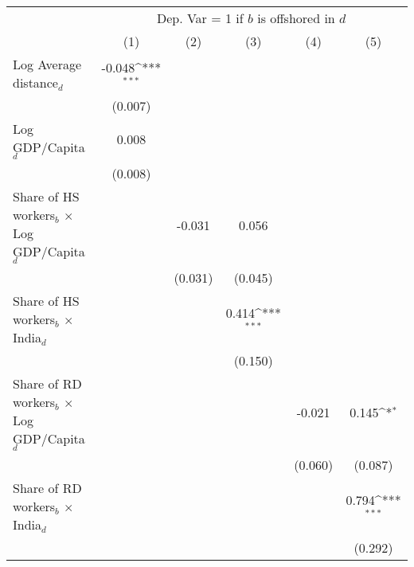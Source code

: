 \begin{table}[htbp] \footnotesize \centering
\def\sym#1{\ifmmode^{#1}\else\(^{#1}\)\fi}
\renewcommand{\arraystretch}{1}
\begin{tabular}{l*{5}{c}}
\toprule
&\multicolumn{5}{c}{Dep. Var = 1 if $ b $ is offshored in $ d $} \\
\cmidrule(lr){2-6}
                &\multicolumn{1}{c}{(1)}         &\multicolumn{1}{c}{(2)}         &\multicolumn{1}{c}{(3)}         &\multicolumn{1}{c}{(4)}         &\multicolumn{1}{c}{(5)}         \\
\midrule
Log Average distance$ _d$&   -0.048\sym{***}&                  &                  &                  &                  \\
                &  (0.007)         &                  &                  &                  &                  \\
\addlinespace
Log GDP/Capita$ _d$&    0.008         &                  &                  &                  &                  \\
                &  (0.008)         &                  &                  &                  &                  \\
\addlinespace
Share of HS workers$ _b$ $\times$ Log GDP/Capita$ _d$&                  &   -0.031         &    0.056         &                  &                  \\
                &                  &  (0.031)         &  (0.045)         &                  &                  \\
\addlinespace
Share of HS workers$ _b$ $\times$ India$ _d$&                  &                  &    0.414\sym{***}&                  &                  \\
                &                  &                  &  (0.150)         &                  &                  \\
\addlinespace
Share of RD workers$ _b$ $\times$ Log GDP/Capita$ _d$&                  &                  &                  &   -0.021         &    0.145\sym{*}  \\
                &                  &                  &                  &  (0.060)         &  (0.087)         \\
\addlinespace
Share of RD workers$ _b$ $\times$ India$ _d$&                  &                  &                  &                  &    0.794\sym{***}\\
                &                  &                  &                  &                  &  (0.292)         \\

\end{tabular}
\end{table}
